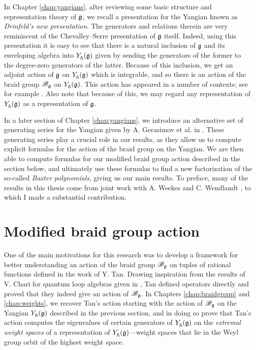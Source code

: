 In Chapter \ref{chap:yangians}, after reviewing some basic structure and representation theory of $\mathfrak{g}$, we recall a presentation for the Yangian known as \emph{Drinfeld's new presentation}.
The generators and relations therein are very reminiscent of the Chevalley--Serre presentation of $\mathfrak{g}$ itself.
Indeed, using this presentation it is easy to see that there is a natural inclusion of $\mathfrak{g}$ and its enveloping algebra into $Y_\hbar^{}(\mathfrak{g})$ given by sending the generators of the former to the degree-zero generators of the latter.
Because of this inclusion, we get an adjoint action of $\mathfrak{g}$ on $Y_\hbar^{}(\mathfrak{g})$ which is integrable, and so there is an action of the braid group $\mathscr{B}_{\mathfrak{g}}$ on $Y_\hbar^{}(\mathfrak{g})$.
This action has appeared in a number of contexts; see for example \cite{guay_coproduct_2018, kodera_braid_2019, weekes_highest_2016}.
Also note that because of this, we may regard any representation of $Y_\hbar^{}(\mathfrak{g})$ as a representation of $\mathfrak{g}$.

In a later section of Chapter \ref{chap:yangians}, we introduce an alternative set of generating series for the Yangian given by A. Gerasimov et al. in \cite{gerasimov_class_2005}.
These generating series play a crucial role in our results, as they allow us to compute explicit formulas for the action of the braid group on the Yangian.
We are then able to compute formulas for our modified braid group action described in the section below, and ultimately use these formulas to find a new factorization of the so-called \emph{Baxter polynomials}, giving us our main results.
To preface, many of the results in this thesis come from joint work with A. Weekes and C. Wendlandt \cite{friesen_braid_2024}, to which I made a substantial contribution.


\section{Modified braid group action}

One of the main motivations for this research was to develop a framework for better understanding an action of the braid group $\mathscr{B}_{\mathfrak{g}}$ on tuples of rational functions defined in the work \cite{tan_braid_2015} of Y. Tan.
Drawing inspiration from the results of V. Chari for quantum loop algebras given in \cite{chari_braid_2002}, Tan defined operators directly and proved that they indeed give an action of $\mathscr{B}_{\mathfrak{g}}$.
In Chapters \ref{chap:braidgroup} and \ref{chap:weights}, we recover Tan's action starting with the action of $\mathscr{B}_{\mathfrak{g}}$ on the Yangian $Y_\hbar^{}(\mathfrak{g})$ described in the previous section, and in doing so prove that Tan's action computes the eigenvalues of certain generators of $Y_\hbar^{}(\mathfrak{g})$ on the \emph{extremal weight spaces} of a representation of $Y_\hbar^{}(\mathfrak{g})$---weight spaces that lie in the Weyl group orbit of the highest weight space.

